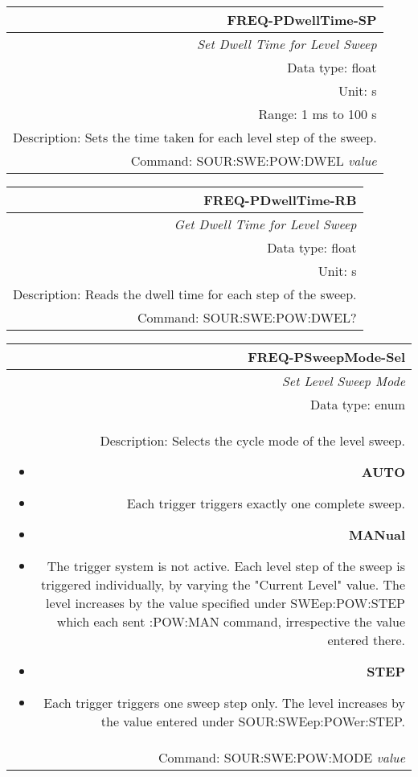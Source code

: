 \documentclass[openany]{article}
\begin{document}
%
		\begin{tabular}{N}
			\hline
			\bfseries FREQ-PDwellTime-SP \\ \hline
			\emph{Set Dwell Time for Level Sweep} \\
			Data type: float \\
			Unit: s \\
			Range: 1 ms to 100 s \\
			Description: Sets the time taken for each level step of the sweep. \\
			Command: SOUR:SWE:POW:DWEL \emph{value} \\
			
		\end{tabular}


		\begin{tabular}{N}
			\hline
			\bfseries FREQ-PDwellTime-RB \\ \hline
			\emph{Get Dwell Time for Level Sweep} \\
			Data type: float \\
			Unit: s \\
			Description: Reads the dwell time for each step of the sweep. \\
			Command: SOUR:SWE:POW:DWEL? \\

		\end{tabular}
%
		\begin{tabular}{N}
			\hline
			\bfseries FREQ-PSweepMode-Sel \\ \hline
			\emph{Set Level Sweep Mode} \\
			Data type: enum \\
			Description: Selects the cycle mode of the level sweep.\begin{itemize}[noitemsep]
				\small
				\item[] \textbf{AUTO}
				\item[] Each trigger triggers exactly one complete sweep.
				\item[] \textbf{MANual}
				\item[] The trigger system is not active. Each level step of the sweep is triggered individually, by varying the "Current Level" value. The level increases by the value specified under SWEep:POW:STEP which each sent :POW:MAN command, irrespective the value entered there.
				\item[] \textbf{STEP}
				\item[] Each trigger triggers one sweep step only. The level increases by the value entered under SOUR:SWEep:POWer:STEP.
			\end{itemize} \\
			Command: SOUR:SWE:POW:MODE \emph{value} \\

		\end{tabular}
\end{document}
